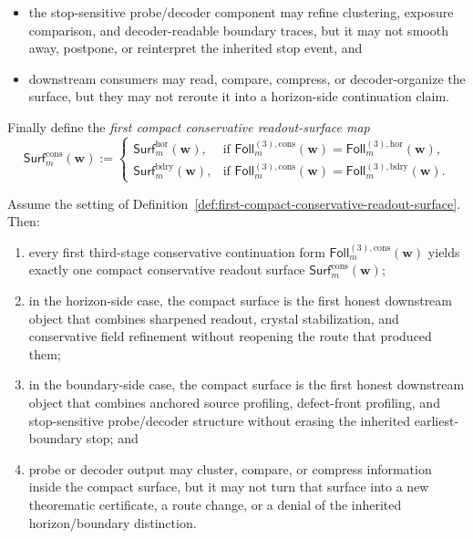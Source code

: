 \begin{definition}
\begin{enumerate}[label=(\roman*)]
\begin{itemize}[leftmargin=2em]
    \item the stop-sensitive probe/decoder component may refine clustering, exposure comparison, and decoder-readable boundary traces, but it may not smooth away, postpone, or reinterpret the inherited stop event, and
    \item downstream consumers may read, compare, compress, or decoder-organize the surface, but they may not reroute it into a horizon-side continuation claim.
  \end{itemize}
\end{enumerate}
Finally define the \emph{first compact conservative readout-surface map}
\[
  \mathsf{Surf}^{\mathrm{cons}}_{m}(\mathbf w)
  :=
  \begin{cases}
    \mathsf{Surf}^{\mathrm{hor}}_{m}(\mathbf w), & \text{if }\mathsf{Foll}^{(3),\mathrm{cons}}_{m}(\mathbf w)=\mathsf{Foll}^{(3),\mathrm{hor}}_{m}(\mathbf w),\\[2mm]
    \mathsf{Surf}^{\mathrm{bdry}}_{m}(\mathbf w), & \text{if }\mathsf{Foll}^{(3),\mathrm{cons}}_{m}(\mathbf w)=\mathsf{Foll}^{(3),\mathrm{bdry}}_{m}(\mathbf w).
  \end{cases}
\]
\end{definition}

\begin{proposition}
\label{prop:every-first-third-stage-conservative-continuation-yields-exactly-one-compact-conservative-readout-surface}
Assume the setting of Definition~\ref{def:first-compact-conservative-readout-surface}. Then:
\begin{enumerate}[label=(\roman*)]
  \item every first third-stage conservative continuation form \(\mathsf{Foll}^{(3),\mathrm{cons}}_{m}(\mathbf w)\) yields exactly one compact conservative readout surface \(\mathsf{Surf}^{\mathrm{cons}}_{m}(\mathbf w)\);
  \item in the horizon-side case, the compact surface is the first honest downstream object that combines sharpened readout, crystal stabilization, and conservative field refinement without reopening the route that produced them;
  \item in the boundary-side case, the compact surface is the first honest downstream object that combines anchored source profiling, defect-front profiling, and stop-sensitive probe/decoder structure without erasing the inherited earliest-boundary stop; and
  \item probe or decoder output may cluster, compare, or compress information inside the compact surface, but it may not turn that surface into a new theorematic certificate, a route change, or a denial of the inherited horizon/boundary distinction.
\end{enumerate}
\end{proposition}


